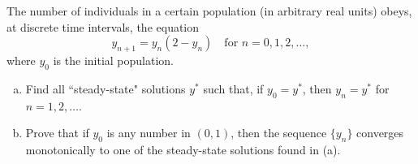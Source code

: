 The number of individuals in a certain population (in arbitrary real units)
obeys, at discrete time intervals, the equation
$$ y_{n+1} = y_n (2 - y_n) \quad\text{for } n = 0, 1, 2, \dots, $$
where $y_0$ is the initial population.

\begin{enumerate}[(a)]

\item Find all ``steady-state" solutions $y^*$ such that, if $y_0 = y^*$, then
      $y_n = y^*$ for $n = 1, 2, \dots$.
\item Prove that if $y_0$ is any number in $(0, 1)$, then the sequence $\lbrace
      y_n \rbrace$ converges monotonically to one of the steady-state solutions
      found in (a).

\end{enumerate}
